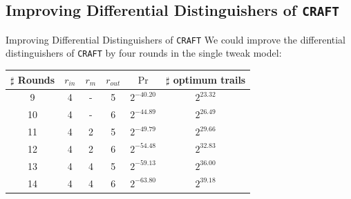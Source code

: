 \documentclass{beamer}
\begin{document}
\subsection{Improving Differential Distinguishers of \texttt{CRAFT}}
\begin{frame}{Improving Differential Distinguishers of \texttt{CRAFT}}
We could improve the differential distinguishers of \texttt{CRAFT} by four rounds in the single tweak model:
\vspace{5mm}
\begin{center}
\begin{tabular}{|c|ccc|c|c|}
\hline
 $\sharp$ Rounds &  $r_{in}$  &  $r_{m}$ & $r_{out}$ &$\Pr$& $\sharp$ optimum trails\\ 
	 	 \hline
9  &  4  & -  & 5&$2^{-40.20}$&$2^{ 23.32}$\\ 
 10 &  4  & -  & 6&$2^{-44.89}$&$2^{26.49}$\\
 11 &  4  & 2  &5 &$2^{-49.79}$&$2^{29.66}$\\ 
 12 &  4  & 2  & 6&$2^{-54.48}$&$2^{32.83}$\\
 13 &  4  & 4  & 5&$2^{-59.13}$&$2^{36.00}$\\
 14 &  4 & 4  & 6&$2^{-63.80}$ &$2^{39.18}$ \\
\hline
\end{tabular}
\end{center}
\end{frame}
\end{document}
